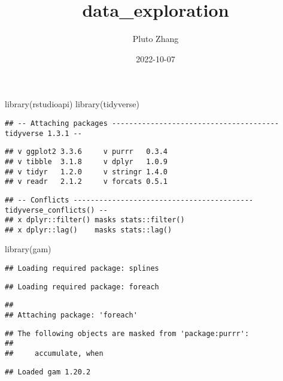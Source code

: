 \documentclass[
]{article}
\title{data\_exploration}
\author{Pluto Zhang}
\date{2022-10-07}
\newenvironment{Shaded}{\begin{snugshade}}{\end{snugshade}}
\newcommand{\FunctionTok}[1]{\textcolor[rgb]{0.00,0.00,0.00}{#1}}
\newcommand{\NormalTok}[1]{#1}
\begin{document}
\maketitle

\begin{Shaded}
\begin{Highlighting}[]
\FunctionTok{library}\NormalTok{(rstudioapi)}
\FunctionTok{library}\NormalTok{(tidyverse)}
\end{Highlighting}
\end{Shaded}

\begin{verbatim}
## -- Attaching packages --------------------------------------- tidyverse 1.3.1 --
\end{verbatim}

\begin{verbatim}
## v ggplot2 3.3.6     v purrr   0.3.4
## v tibble  3.1.8     v dplyr   1.0.9
## v tidyr   1.2.0     v stringr 1.4.0
## v readr   2.1.2     v forcats 0.5.1
\end{verbatim}

\begin{verbatim}
## -- Conflicts ------------------------------------------ tidyverse_conflicts() --
## x dplyr::filter() masks stats::filter()
## x dplyr::lag()    masks stats::lag()
\end{verbatim}

\begin{Shaded}
\begin{Highlighting}[]
\FunctionTok{library}\NormalTok{(gam)}
\end{Highlighting}
\end{Shaded}

\begin{verbatim}
## Loading required package: splines
\end{verbatim}

\begin{verbatim}
## Loading required package: foreach
\end{verbatim}

\begin{verbatim}
## 
## Attaching package: 'foreach'
\end{verbatim}

\begin{verbatim}
## The following objects are masked from 'package:purrr':
## 
##     accumulate, when
\end{verbatim}

\begin{verbatim}
## Loaded gam 1.20.2
\end{verbatim}
\end{document}
